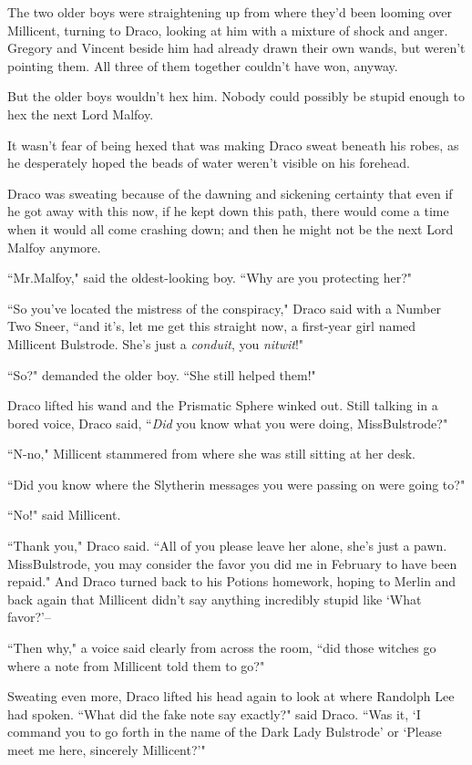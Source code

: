 The two older boys were straightening up from where they'd been looming over Millicent, turning to Draco, looking at him with a mixture of shock and anger. Gregory and Vincent beside him had already drawn their own wands, but weren't pointing them. All three of them together couldn't have won, anyway.

But the older boys wouldn't hex him. Nobody could possibly be stupid enough to hex the next Lord Malfoy.

It wasn't fear of being hexed that was making Draco sweat beneath his robes, as he desperately hoped the beads of water weren't visible on his forehead.

Draco was sweating because of the dawning and sickening certainty that even if he got away with this now, if he kept down this path, there would come a time when it would all come crashing down; and then he might not be the next Lord Malfoy anymore.

``Mr.\?Malfoy," said the oldest-looking boy. ``Why are you protecting her?"

``So you've located the mistress of the conspiracy," Draco said with a Number Two Sneer, ``and it's, let me get this straight now, a first-year girl named Millicent Bulstrode. She's just a \emph{conduit}, you \emph{nitwit}!"

``So?" demanded the older boy. ``She still helped them!"

Draco lifted his wand and the Prismatic Sphere winked out. Still talking in a bored voice, Draco said, ``\emph{Did} you know what you were doing, Miss\?Bulstrode?"

``N-no," Millicent stammered from where she was still sitting at her desk.

``Did you know where the Slytherin messages you were passing on were going to?"

``No!" said Millicent.

``Thank you," Draco said. ``All of you please leave her alone, she's just a pawn. Miss\?Bulstrode, you may consider the favor you did me in February to have been repaid." And Draco turned back to his Potions homework, hoping to Merlin and back again that Millicent didn't say anything incredibly stupid like `What favor?'\---

``Then why," a voice said clearly from across the room, ``did those witches go where a note from Millicent told them to go?"

Sweating even more, Draco lifted his head again to look at where Randolph Lee had spoken. ``What did the fake note say exactly?" said Draco. ``Was it, `I command you to go forth in the name of the Dark Lady Bulstrode' or `Please meet me here, sincerely Millicent?'"

